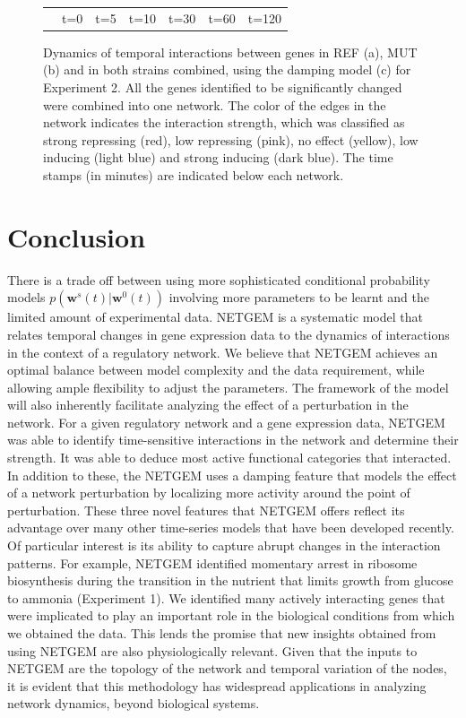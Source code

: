 \documentclass{bioinfo}
\begin{document}
\begin{figure}
\begin{tabular}{lcccccc}
&  t=0 & t=5 & t=10 & t=30 & t=60 & t=120
  \end{tabular}
  \caption{Dynamics of temporal interactions between genes in REF (a), MUT (b) and in both strains combined, using the damping model (c) for Experiment 2. All the genes identified to be significantly changed \citep{Cipollina2008} were combined into one network. The color of the edges in the network indicates the interaction strength, which was classified as strong repressing (red), low repressing (pink), no effect (yellow), low inducing (light blue) and strong inducing (dark blue). The time stamps (in minutes) are indicated below each network.}
\end{figure}

\section{Conclusion}
\label{sec:conclusions}
There is a trade off between using more sophisticated conditional probability models $p(\mathbf{w}^{s}(t) |\mathbf{w}^{0}(t))$ involving more parameters to be learnt and the limited amount of experimental data. NETGEM is a systematic model that relates temporal changes in gene expression data to the dynamics of interactions in the context of a regulatory network. We believe that NETGEM achieves an optimal balance between model complexity and the data requirement, while allowing ample flexibility to adjust the parameters. The framework of the model will also inherently facilitate analyzing the effect of a perturbation in the network. For a given regulatory network and a gene expression data, NETGEM was able to identify time-sensitive interactions in the network and determine their strength. It was able to deduce most active functional categories that interacted. In addition to these, the NETGEM uses a damping feature that models the effect of a network perturbation by localizing more activity around the point of perturbation. These three novel features that NETGEM offers reflect its advantage over many other time-series models that have been developed recently. Of particular interest is its ability to capture abrupt changes in the interaction patterns. For example, NETGEM identified momentary arrest in ribosome biosynthesis during the transition in the nutrient that limits growth from glucose to ammonia (Experiment 1). We identified many actively interacting genes that were implicated to play an important role in the biological conditions from which we obtained the data. This lends the promise that new insights obtained from using NETGEM are also physiologically relevant. Given that the inputs to NETGEM are the topology of the network and temporal variation of the nodes, it is evident that this methodology has widespread applications in analyzing network dynamics, beyond biological systems.
\end{document}
